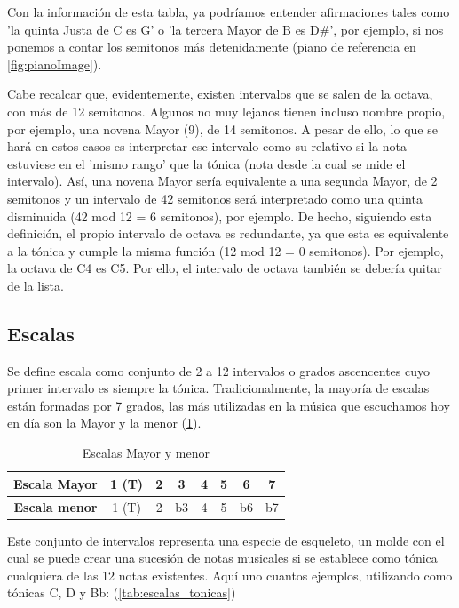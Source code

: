 Con la información de esta tabla, ya podríamos entender afirmaciones tales como 'la quinta Justa de C es G' o 'la tercera Mayor de B es D\#', por ejemplo, si nos ponemos a contar los semitonos más detenidamente (piano de referencia en \ref{fig:pianoImage}).

Cabe recalcar que, evidentemente, existen intervalos que se salen de la octava, con más de 12 semitonos. Algunos no muy lejanos tienen incluso nombre propio, por ejemplo, una novena Mayor (9), de 14 semitonos. A pesar de ello, lo que se hará en estos casos es interpretar ese intervalo como su relativo si la nota estuviese en el 'mismo rango' que la tónica (nota desde la cual se mide el intervalo). Así, una novena Mayor sería equivalente a una segunda Mayor, de 2 semitonos y un intervalo de 42 semitonos será interpretado como una quinta disminuida (42 mod 12 = 6 semitonos), por ejemplo. De hecho, siguiendo esta definición, el propio intervalo de octava es redundante, ya que esta es equivalente a la tónica y cumple la misma función (12 mod 12 = 0 semitonos). Por ejemplo, la octava de C4 es C5. Por ello, el intervalo de octava también se debería quitar de la lista.

\subsection{Escalas}\label{sec:arm:escalas}

Se define escala como conjunto de 2 a 12 intervalos o grados ascencentes cuyo primer intervalo es siempre la tónica. Tradicionalmente, la mayoría de escalas están formadas por 7 grados, las más utilizadas en la música que escuchamos hoy en día son la Mayor y la menor (\ref{tab:escalas}).

\begin{table}[h]
    \centering
    \begin{tabular}{c|c|c|c|c|c|c|c}
        \textbf{Escala Mayor} & 1 (T) & 2 & 3 & 4 & 5 & 6 & 7 \\
        \hline
        \hline
        \textbf{Escala menor} & 1 (T) & 2 & b3 & 4 & 5 & b6 & b7 \\
    \end{tabular}
    \caption{Escalas Mayor y menor}
    \label{tab:escalas}
\end{table}

Este conjunto de intervalos representa una especie de esqueleto, un molde con el cual se puede crear una sucesión de notas musicales si se establece como tónica cualquiera de las 12 notas existentes. Aquí uno cuantos  ejemplos, utilizando como tónicas C, D y Bb: (\ref{tab:escalas_tonicas})

